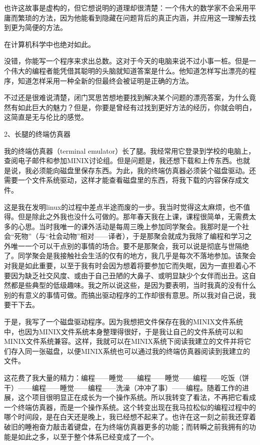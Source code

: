 也许这故事是虚构的，但它想说明的道理却很清楚：一个伟大的数学家不会采用平庸而繁琐的方法，因为他能看到隐藏在问题背后的真正内涵，并应用这一理解去找到更为简便的方法。

在计算机科学中也绝对如此。

没错，你能写一个程序来求出总数。这对于今天的电脑来说不过小事一桩。但是一个伟大的编程者能凭借其聪明的头脑就知道答案是什么。他知道怎样写出漂亮的程序，知道怎样采用一种全新的但最终会被证明是正确的方法。

 

不过还是很难说清楚，闭门冥思苦想地要找到解决某个问题的漂亮答案，为什么竟然有如此巨大的魅力？但是，你要是曾经有过找到更好方法的经历，你就会明白，这简直是无与伦比的感觉。

 
2、长腿的终端仿真器

我的终端仿真器（terminal emulator）长了腿。我经常用它登录到学校的电脑上，查阅电子邮件和参加MINIX讨论组。但是问题是，我还想下载和上传东西。也就是说，我必须能向磁盘里保存东西。为此，我的终端仿真器必须装个磁盘驱动。还需要一个文件系统驱动，这样才能查看磁盘里的东西，将我下载的内容保存成文件。

这是我在发明linux的过程中差点半途而废的一步。我当时觉得这太麻烦，也不值得。但是除此之外我也没什么可做的。那年春天我在上课，课程很简单，无需费太多的心思。当时我唯一的课外活动是每周三晚上参加同学聚会。我那时是一个社会“死物”（与“社会动物”相对——译者），于是那聚会就成为我除了编程和学习之外唯一一个可以干点别的事情的场合。要不是那聚会，我可以说是彻底与世隔绝了。同学聚会是我接触社会生活的仅有的地方，我几乎是每次不落地参加。该聚会对我是如此重要，以至于我有时会因为想着将要参加它而失眠，因为一直担着心不要因为缺乏社交风度、或由于自己丑陋的大鼻子、或明显缺少个女伴而出丑。这自然都是些典型的低级趣味。我之所以说这些，是因为要表明，当时我真的没有什么别的有意义的事情可做。而搞出驱动程序的工作却很有意思。所以我对自己说，我要干下去。

于是，我写了一个磁盘驱动程序。因为我想把文件保存在我的MINIX文件系统中，也因为MINIX文件系统本身整理得很好，于是我让自己的文件系统可以和MINIX文件系统兼容。这样，我就可以在MINIX系统下阅读我建立的文件并将它们存入同一张磁盘，以便MINIX系统也可以通过我的终端仿真器阅读到我建立的文件。

这花费了我大量的精力：编程——睡觉——编程——睡觉——编程——吃饭（饼干）——编程——睡觉——编程——洗澡（冲冲了事）——编程。随着工作的进展，这个项目很明显正在成长为一个操作系统。所以我转变了看法，不再把它看成一个终端仿真器，而是一个操作系统。这个转变出现在我马拉松似的编程过程中的哪个时间段，是在白天还是晚上，我已经想不起来了。也许在这一刻之前我还穿着破旧的睡袍奋力敲击着键盘，在为终端仿真器更多的功能；而转瞬之前我拥有的功能是如此之多，以至于整个体系已经变成了一个。

